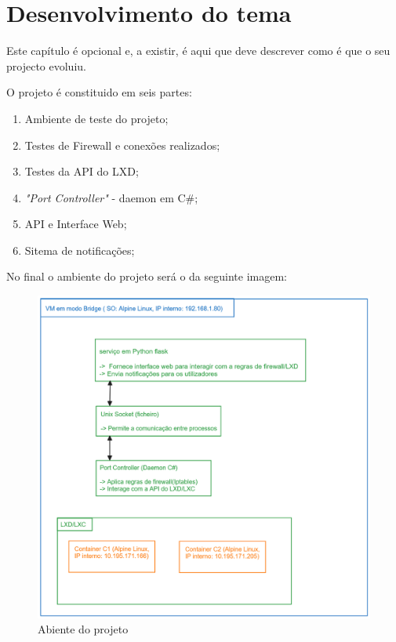 \chapter{Desenvolvimento do tema}
\label{cap:experiments}

Este capítulo é opcional e, a existir, é aqui que deve descrever como é que o seu projecto evoluiu.

O projeto é constituido em seis partes:

\begin{enumerate}
    \item Ambiente de teste do projeto;
    \item Testes de Firewall e conexões realizados;
    \item Testes da API do LXD;
    \item \textit{"Port Controller"} - daemon em C\#;
    \item API e Interface Web;
    \item Sitema de notificações;
\end{enumerate}


No final o ambiente do projeto será o da seguinte imagem:

\begin{figure}[H]
\begin{center}
\includegraphics[width=14cm]{figs/estrutura2.png}
\caption{Abiente do projeto}
\label{fig:bookstack}
\end{center}
\end{figure}




